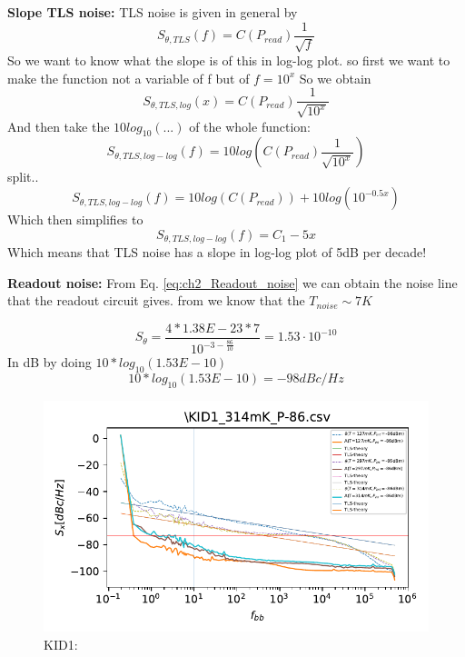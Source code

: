 \textbf{Slope TLS noise:}
TLS noise is given in general by 
\begin{equation}
	S_{\theta,TLS}(f) = C(P_{read})\frac{1}{\sqrt{f}}
\end{equation}
So we want to know what the slope is of this in log-log plot. 
so first we want to make the function not a variable of f but of $f=10^{x}$
So we obtain 
\begin{equation}
	S_{\theta,TLS,log}(x) = C(P_{read})\frac{1}{\sqrt{10^{x}}}
\end{equation}
And then take the $10log_{10}(...)$ of the whole function:
\begin{equation}
	S_{\theta,TLS,log-log}(f) = 10log(C(P_{read})\frac{1}{\sqrt{10^{x}}})
\end{equation}
split..
\begin{equation}
	S_{\theta,TLS,log-log}(f) = 10log(C(P_{read}))+10log(10^{-0.5x})
\end{equation}
Which then simplifies to 
\begin{equation}
	S_{\theta,TLS,log-log}(f) = C_{1}-5x
\end{equation}
Which means that TLS noise has a slope in log-log plot of 5dB per decade!

\textbf{Readout noise:}
From Eq. \ref{eq:ch2_Readout_noise} we can obtain the noise line that the readout circuit gives.
from \cite{devisserVisser2014Quasiparticle2014} we know that the $T_{noise} \sim 7K$

\begin{equation}
	S_{\theta} = \frac{4*1.38E-23*7}{10^{-3-\frac{86}{10}}} = 1.53\cdot 10^{-10} 
\end{equation}
In dB by doing $10*log_{10}(1.53E-10)$
$$10*log_{10}(1.53E-10) = -98 dBc/Hz$$


\begin{figure}[ht]
	\centering
	\includegraphics[width=.95\linewidth]{figures/ch5_measurement/KID1_127mK_P-86KID1_297mK_P-86KID1_314mK_P-86.pdf}
	\caption{KID1:}
	\label{fig:First_results}
\end{figure}

